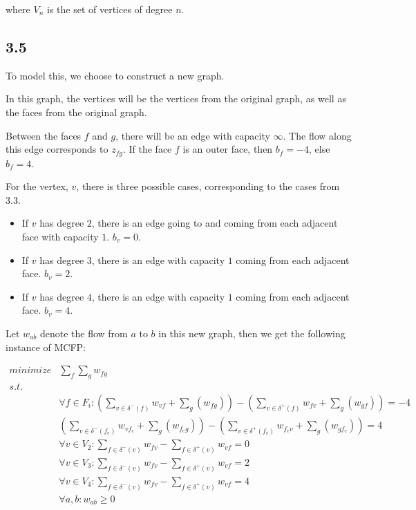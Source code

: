 \documentclass[11pt,a4paper]{article}
\begin{document}
where $V_n$ is the set of vertices of degree $n$.

\subsection{3.5}
To model this, we choose to construct a new graph.

In this graph, the vertices will be the vertices from the original graph, as
well as the faces from the original graph.

Between the faces $f$ and $g$, there will be an edge with capacity
$\infty$. The flow along this edge corresponds to $z_{fg}$.
If the face $f$ is an outer face, then $b_f = -4$, else $b_f = 4$.

For the vertex, $v$, there is three possible cases, corresponding to the cases from
3.3.

\begin{itemize}
    \item If $v$ has degree $2$, there is an edge going to and coming from each adjacent face
          with capacity $1$. $b_v = 0$.
    \item If $v$ has degree $3$, there is an edge with capacity $1$ coming from each adjacent face.
          $b_v = 2$.
    \item If $v$ has degree $4$, there is an edge with capacity $1$ coming from each adjacent face.
          $b_v = 4$.
\end{itemize}

Let $w_{ab}$ denote the flow from $a$ to $b$ in this new graph, then we get the following instance of MCFP:

\begin{align*}
    minimize & \sum_f \sum_g w_{fg} \\
    s.t.     & \\
             & \forall f \in F_i: \left(\sum_{v \in \delta^-(f)} w_{vf} + \sum_g (w_{fg})\right) - \left(\sum_{v \in \delta^+(f)} w_{fv} + \sum_g (w_{gf})\right) = -4 \\
             & \left(\sum_{v \in \delta^-(f_e)} w_{vf_e} + \sum_g (w_{f_eg})\right) - \left(\sum_{v \in \delta^+(f_e)} w_{f_ev} + \sum_g (w_{gf_e})\right) = 4 \\
             & \forall v \in V_2: \sum_{f \in \delta^-(v)} w_{fv} - \sum_{f \in \delta^+(v)} w_{vf} = 0 \\
             & \forall v \in V_3: \sum_{f \in \delta^-(v)} w_{fv} - \sum_{f \in \delta^+(v)} w_{vf} = 2 \\
             & \forall v \in V_4: \sum_{f \in \delta^-(v)} w_{fv} - \sum_{f \in \delta^+(v)} w_{vf} = 4 \\
             & \forall a, b: w_{ab} \geq 0 
\end{align*}



\end{document}
